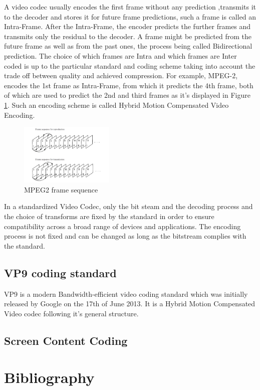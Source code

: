\documentclass[a4paper,11pt,oneside]{article}
\begin{document}
\clearpage
\indent A video codec usually encodes the first frame without any prediction ,transmits it to the decoder and stores it for future frame predictions, such a frame is called an Intra-Frame. After the Intra-Frame, the encoder predicts the further frames and transmits only the residual to the decoder. A frame might be predicted from the future frame as well as from the past ones, the process being called Bidirectional prediction. The choice of which frames are Intra and which frames are Inter coded is up to the particular standard and coding scheme taking into account the trade off between quality and achieved compression. For example, MPEG-2, encodes the 1st frame as Intra-Frame, from which it predicts the 4th frame, both of which are used to predict the 2nd and third frames as it's displayed in Figure \ref{figure:mpeg2_frame_sequence}. Such an encoding scheme is called Hybrid Motion Compensated Video Encoding.\\ 
\begin{figure}[h]
  \centering
  \includegraphics[width=0.4\textwidth]{../figures/frame_sequence_mpeg2.pdf}
  \caption{MPEG2 frame sequence \cite[p.98]{dsp_henkel}}
  \label{figure:mpeg2_frame_sequence}
\end{figure} 
\indent In a standardized Video Codec, only the bit steam and the decoding process and the choice of transforms are fixed by the standard in order to ensure compatibility across a broad range of devices and applications. The encoding process is not fixed and can be changed as long as the bitstream complies with the standard.      \cite{vsp_coursera} 

\subsection{VP9 coding standard}
VP9 is a modern Bandwidth-efficient video coding standard which was initially released by Google on the 17th of June 2013. It is a Hybrid Motion Compensated Video codec following it's general structure.  

\subsection{Screen Content Coding}






\newpage
\section*{Bibliography}
\printbibliography
\end{document}
